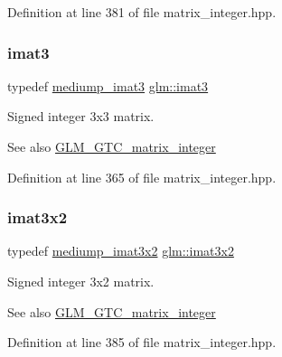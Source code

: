 Definition at line 381 of file matrix\+\_\+integer.\+hpp.

\mbox{\label{group__gtc__matrix__integer_ga45481922dd07a3a8e23758286311ee97}} 
\subsubsection{\texorpdfstring{imat3}{imat3}}
{\footnotesize\ttfamily typedef \mbox{\hyperlink{group__gtc__matrix__integer_gab033bd6a2bfebb1aa35d458c6f077ccb}{mediump\+\_\+imat3}} \mbox{\hyperlink{group__gtc__matrix__integer_ga45481922dd07a3a8e23758286311ee97}{glm\+::imat3}}}

Signed integer 3x3 matrix. \begin{DoxySeeAlso}{See also}
\mbox{\hyperlink{group__gtc__matrix__integer}{G\+L\+M\+\_\+\+G\+T\+C\+\_\+matrix\+\_\+integer}} 
\end{DoxySeeAlso}


Definition at line 365 of file matrix\+\_\+integer.\+hpp.

\mbox{\label{group__gtc__matrix__integer_ga04deef94cdfdd3b3b2706e10a32ef7f3}} 
\subsubsection{\texorpdfstring{imat3x2}{imat3x2}}
{\footnotesize\ttfamily typedef \mbox{\hyperlink{group__gtc__matrix__integer_ga8f682b5b64e2072c0729409ee6bfe2af}{mediump\+\_\+imat3x2}} \mbox{\hyperlink{group__gtc__matrix__integer_ga04deef94cdfdd3b3b2706e10a32ef7f3}{glm\+::imat3x2}}}

Signed integer 3x2 matrix. \begin{DoxySeeAlso}{See also}
\mbox{\hyperlink{group__gtc__matrix__integer}{G\+L\+M\+\_\+\+G\+T\+C\+\_\+matrix\+\_\+integer}} 
\end{DoxySeeAlso}


Definition at line 385 of file matrix\+\_\+integer.\+hpp.

\mbox{\label{group__gtc__matrix__integer_gaeff9ef8f56cccc828d6b897923e75402}} 
